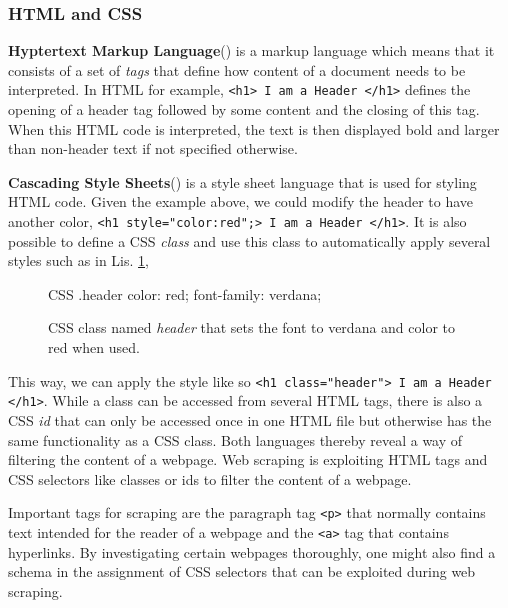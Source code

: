 \subsubsection{HTML and CSS}

\textbf{Hyptertext Markup Language}() is a markup language which means that it consists of a set of \textsl{tags} that define how content of a document needs to be interpreted. In HTML for example, \texttt{<h1> I am a Header </h1>} defines the opening of a header tag followed by some content and the closing of this tag. When this HTML code is interpreted, the text is then displayed bold and larger than non-header text if not specified otherwise.

\textbf{Cascading Style Sheets}() is a style sheet language that is used for styling HTML code. Given the example above, we could modify the header to have another color, \texttt{<h1 style="color:red";>  I am a Header </h1>}. It is also possible to define a CSS \emph{class} and use this class to automatically apply several styles such as in Lis. \ref{lst:css},\renewcommand{\figurename}{Listing}

\begin{figure}[h]
  \centering
  \begin{cminted}{CSS}
    .header {
      color: red;
      font-family: verdana;
    }
  \end{cminted}
  \caption{CSS class named \emph{header} that sets the font to verdana and color to red when used.}
  \label{lst:css}
\end{figure}

This way, we can apply the style like so \texttt{<h1 class="header"> I am a Header </h1>}. While a class can be accessed from several HTML tags, there is also a CSS \emph{id} that can only be accessed once in one HTML file but otherwise has the same functionality as a CSS class.
Both languages thereby reveal a way of filtering the content of a webpage. Web scraping is exploiting HTML tags and CSS selectors like classes or ids to filter the content of a webpage.

Important tags for scraping are the paragraph tag \texttt{<p>} that normally contains text intended for the reader of a webpage and the \texttt{<a>} tag that contains hyperlinks. By investigating certain webpages thoroughly, one might also find a schema in the assignment of CSS selectors that can be exploited during web scraping.

